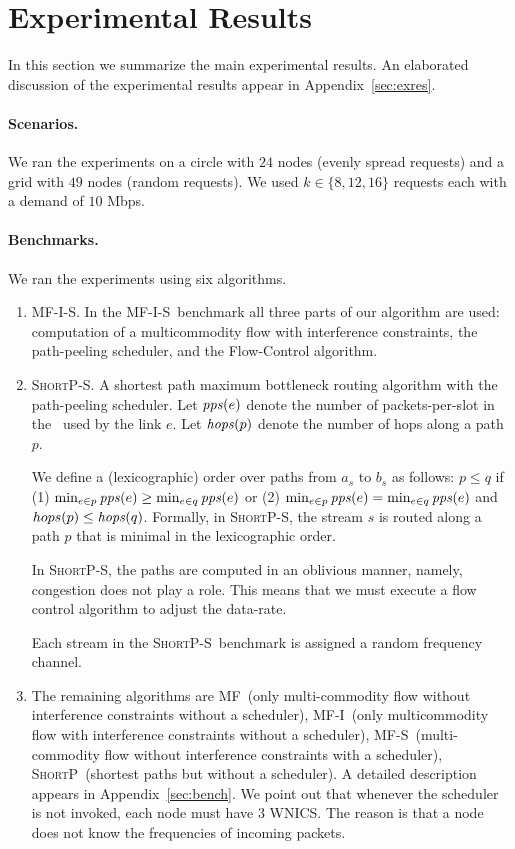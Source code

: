 \documentclass[12pt]{article}
\newenvironment{proof sketch}[1]{\noindent {\emph{Proof sketch of #1:}}}{\hfill \qed}
\newcommand{\pps}{\text{\emph{pps}}}
\newcommand{\hops}{\text{\emph{hops}}}
\newcommand{\MCS}{\text{\sc{mcs}}}
\newcommand{\algA}{\textsc{MF-I-S}}
\newcommand{\algB}{\textsc{ShortP}}
\newcommand{\algBS}{\textsc{ShortP-S}}
\newcommand{\algC}{\textsc{MF-I}}
\newcommand{\algD}{\textsc{MF}}
\newcommand{\algE}{\textsc{MF-S}}
\begin{document}
\section{Experimental Results}
In this section we summarize the main experimental results.
An elaborated discussion of the experimental results appear in Appendix~\ref{sec:exres}.

\paragraph{Scenarios.}
We ran the experiments on a circle with $24$ nodes (evenly spread
requests) and a grid with $49$ nodes (random requests). We used $k\in\{8,12,16\}$
requests each with a demand of $10$ Mbps.

\paragraph{Benchmarks.}
We ran the experiments using six algorithms.
\begin{enumerate}
\item \algA. In the \algA\ benchmark all three parts of our algorithm
  are used: computation of a multicommodity flow with interference
  constraints, the path-peeling scheduler, and the Flow-Control
  algorithm.

\item \algBS. A shortest path maximum bottleneck routing algorithm
  with the path-peeling scheduler.  Let $\pps(e)$ denote the number of
  packets-per-slot in the \MCS\ used by the link $e$.  Let $\hops(p)$
  denote the number of hops along a path $p$.

  We define a (lexicographic) order over paths from $a_s$ to $b_s$ as
  follows: $p \leq q$ if (1) $\min_{e\in p} \pps(e) \geq \min_{e\in q}
  \pps(e)$ or (2) $\min_{e \in p} \pps(e) = \min_{e \in q} \pps(e)$
  and $hops(p) \leq \hops(q)$.  Formally, in \algBS, the stream $s$ is
  routed along a path $p$ that is minimal in the lexicographic order.

  In \algBS, the paths are computed in an oblivious manner, namely,
  congestion does not play a role. This means that we must execute a
  flow control algorithm to adjust the data-rate.

  Each stream in the \algBS\ benchmark is assigned a random
  frequency channel.
\item The remaining algorithms are \algD\ (only multi-commodity flow
  without interference constraints without a scheduler), \algC\ (only
  multicommodity flow with interference constraints without a
  scheduler), \algE\ (multi-commodity flow without interference
  constraints with a scheduler), \algB\ (shortest paths but without a
  scheduler).  A detailed description appears in
  Appendix~\ref{sec:bench}. We point out that whenever the scheduler
  is not invoked, each node must have $3$ WNICS. The reason is that a
  node does not know the frequencies of incoming packets.
\end{enumerate}
\end{document}
